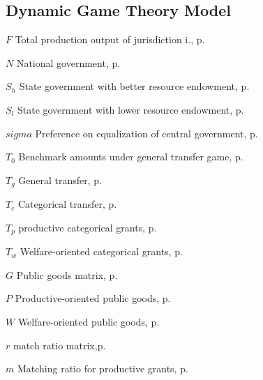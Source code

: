 \begin{eqlist}
    \section*{ Dynamic Game Theory Model}
    \item[$F$]
    Total production output of jurisdiction i., p.~\pageref{F}

    \item[$N$]
    National government, p.~\pageref{player}

    \item[$S_h$]
    State government with better resource endowment, p.~\pageref{player}

    \item[$S_l$]
    State government with lower resource endowment, p.~\pageref{player}

    \item[$sigma$]
    Preference on equalization of central government, p.~\pageref{player}

    \item[$T_0$]
    Benchmark amounts under general transfer game, p.~\pageref{generaltransfer}

    \item[$T_g$]
    General transfer, p.~\pageref{transfer}

    \item[$T_c$]
    Categorical transfer, p.~\pageref{transfer}

    \item[$T_{p}$]
    productive categorical grants, p.~\pageref{catetransfer}

    \item[$T_{w}$]
    Welfare-oriented categorical grants, p.~\pageref{catetransfer}

    \item[$G$]
    Public goods matrix, p.~\pageref{pgmatrix}

    \item[$P$]
    Productive-oriented public goods, p.~\pageref{pgmatrix}

    \item[$W$]
    Welfare-oriented public goods, p.~\pageref{pgmatrix}

    \item[$r$]
    match ratio matrix,p.~\pageref{mrmatrix}

    \item[$m$]
    Matching ratio for productive grants, p.~\pageref{generalandcategorical}


\end{eqlist}

